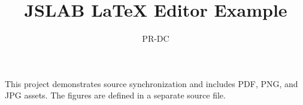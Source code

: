 \documentclass{article}
\title{JSLAB LaTeX Editor Example}
\author{PR-DC}
\begin{document}
\maketitle

This project demonstrates source synchronization and includes PDF, PNG,
and JPG assets. The figures are defined in a separate source file.


\end{document}
